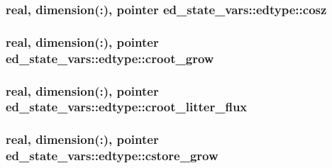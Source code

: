 \subsubsection[{\texorpdfstring{cosz}{cosz}}]{\setlength{\rightskip}{0pt plus 5cm}real, dimension(\+:), pointer ed\+\_\+state\+\_\+vars\+::edtype\+::cosz}\hypertarget{structed__state__vars_1_1edtype_ab5a977e1fb91a16e587e1916a2b4b32a}{}\label{structed__state__vars_1_1edtype_ab5a977e1fb91a16e587e1916a2b4b32a}
\subsubsection[{\texorpdfstring{croot\+\_\+grow}{croot_grow}}]{\setlength{\rightskip}{0pt plus 5cm}real, dimension(\+:), pointer ed\+\_\+state\+\_\+vars\+::edtype\+::croot\+\_\+grow}\hypertarget{structed__state__vars_1_1edtype_afb7daca4b3647dcd52f9bbedabd1b569}{}\label{structed__state__vars_1_1edtype_afb7daca4b3647dcd52f9bbedabd1b569}
\subsubsection[{\texorpdfstring{croot\+\_\+litter\+\_\+flux}{croot_litter_flux}}]{\setlength{\rightskip}{0pt plus 5cm}real, dimension(\+:), pointer ed\+\_\+state\+\_\+vars\+::edtype\+::croot\+\_\+litter\+\_\+flux}\hypertarget{structed__state__vars_1_1edtype_a156191af407a685e6f870a09833b4587}{}\label{structed__state__vars_1_1edtype_a156191af407a685e6f870a09833b4587}
\subsubsection[{\texorpdfstring{cstore\+\_\+grow}{cstore_grow}}]{\setlength{\rightskip}{0pt plus 5cm}real, dimension(\+:), pointer ed\+\_\+state\+\_\+vars\+::edtype\+::cstore\+\_\+grow}\hypertarget{structed__state__vars_1_1edtype_a3b23d174488a370c6c462c3c789330e0}{}\label{structed__state__vars_1_1edtype_a3b23d174488a370c6c462c3c789330e0}
